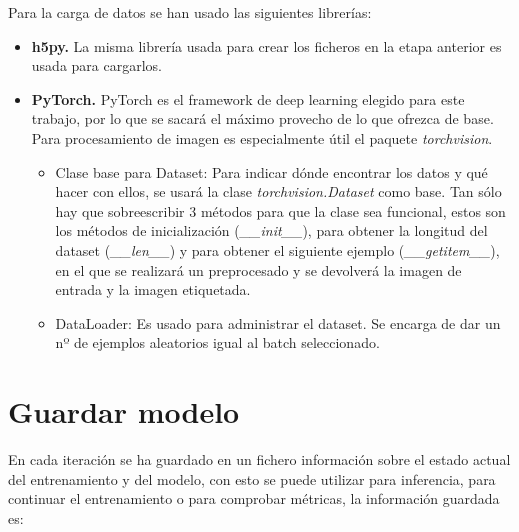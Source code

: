 Para la carga de datos se han usado las siguientes librerías:
\begin{itemize}
\item \textbf{h5py.} La misma librería usada para crear los ficheros en la etapa anterior es usada para cargarlos.
\item \textbf{PyTorch.} PyTorch es el framework de deep learning elegido para este trabajo, por lo que se sacará el máximo provecho de lo que ofrezca de base. Para procesamiento de imagen es especialmente útil el paquete \textit{torchvision}.
\begin{itemize}
\item Clase base para Dataset: Para indicar dónde encontrar los datos y qué hacer con ellos, se usará la clase \textit{torchvision.Dataset} como base. Tan sólo hay que sobreescribir 3 métodos para que la clase sea funcional, estos son los métodos de inicialización (\textit{\_\_init\_\_}), para obtener la longitud del dataset (\textit{\_\_len\_\_}) y para obtener el siguiente ejemplo (\textit{\_\_getitem\_\_}), en el que se realizará un preprocesado y se devolverá la imagen de entrada y la imagen etiquetada.
\item DataLoader: Es usado para administrar el dataset. Se encarga de dar un nº de ejemplos aleatorios igual al batch seleccionado.
\end{itemize}
\end{itemize}

\section{Guardar modelo}\label{sec:store_model}

En cada iteración se ha guardado en un fichero información sobre el estado actual del entrenamiento y del modelo, con esto se puede utilizar para inferencia, para continuar el entrenamiento o para comprobar métricas, la información guardada es:

